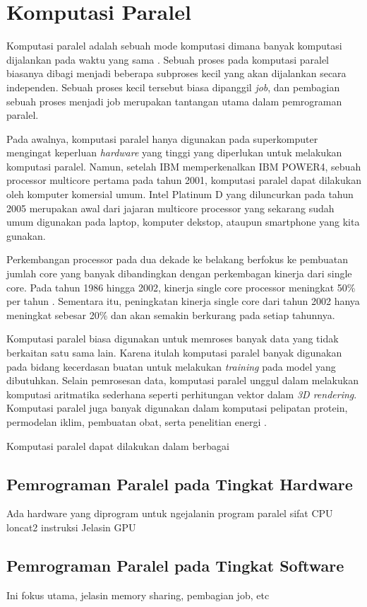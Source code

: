 \section{Komputasi Paralel}
Komputasi paralel adalah sebuah mode komputasi dimana banyak komputasi dijalankan pada waktu yang sama \citep{highly_parallel_computing}. Sebuah proses pada komputasi paralel biasanya dibagi menjadi beberapa subproses kecil yang akan dijalankan secara independen. Sebuah proses kecil tersebut biasa dipanggil \textit{job}, dan pembagian sebuah proses menjadi job merupakan tantangan utama dalam pemrograman paralel.

Pada awalnya, komputasi paralel hanya digunakan pada superkomputer mengingat keperluan \textit{hardware} yang tinggi yang diperlukan untuk melakukan komputasi paralel. Namun, setelah IBM memperkenalkan IBM POWER4, sebuah processor multicore pertama pada tahun 2001, komputasi paralel dapat dilakukan oleh komputer komersial umum. Intel Platinum D yang diluncurkan pada tahun 2005 merupakan awal dari jajaran multicore processor yang sekarang sudah umum digunakan pada laptop, komputer dekstop, ataupun smartphone yang kita gunakan. 

Perkembangan processor pada dua dekade ke belakang berfokus ke pembuatan jumlah core yang banyak dibandingkan dengan perkembagan kinerja dari single core. Pada tahun 1986 hingga 2002, kinerja single core processor meningkat 50\% per tahun \citep{comp_arch_patterson}. Sementara itu, peningkatan kinerja single core dari tahun 2002 hanya meningkat sebesar 20\% \citep{intro_parallel} dan akan semakin berkurang pada setiap tahunnya. 


Komputasi paralel biasa digunakan untuk memroses banyak data yang tidak berkaitan satu sama lain. Karena itulah komputasi paralel banyak digunakan pada bidang kecerdasan buatan untuk melakukan \textit{training} pada model yang dibutuhkan. Selain pemrosesan data, komputasi paralel unggul dalam melakukan komputasi aritmatika sederhana seperti perhitungan vektor dalam \textit{3D rendering}. Komputasi paralel juga banyak digunakan dalam komputasi pelipatan protein, permodelan iklim, pembuatan obat, serta penelitian energi \citep{intro_parallel}. 


Komputasi paralel dapat dilakukan dalam berbagai 
\subsection{Pemrograman Paralel pada Tingkat Hardware}
Ada hardware yang diprogram untuk ngejalanin program paralel
sifat CPU loncat2 instruksi
Jelasin GPU
\subsection{Pemrograman Paralel pada Tingkat Software}
Ini fokus utama, jelasin memory sharing, pembagian job, etc

